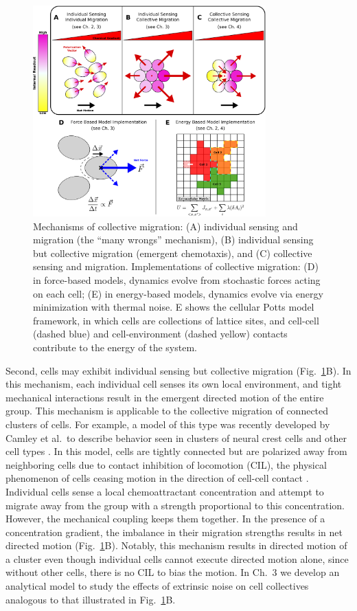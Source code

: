 \begin{figure}[ht]
    \centering
        \includegraphics[width=0.8\textwidth]{../fig/ch1_fig3.pdf}
    \caption{Mechanisms of collective migration: (A) individual sensing and migration (the ``many wrongs'' mechanism), (B) individual sensing but collective migration (emergent chemotaxis), and (C) collective sensing and migration. Implementations of collective migration: (D) in force-based models, dynamics evolve from stochastic forces acting on each cell; (E) in energy-based models, dynamics evolve via energy minimization with thermal noise. E shows the cellular Potts model framework, in which cells are collections of lattice sites, and cell-cell (dashed blue) and cell-environment (dashed yellow) contacts contribute to the energy of the system.}
\label{fig:ch1_3}
\end{figure}


Second, cells may exhibit individual sensing but collective migration (Fig.\ \ref{fig:ch1_3}B). In this mechanism, each individual cell senses its own local environment, and tight mechanical interactions result in the emergent directed motion of the entire group. This mechanism is applicable to the collective migration of connected clusters of cells. For example, a model of this type was recently developed by Camley et al.\ to describe behavior seen in clusters of neural crest cells and other cell types \cite{camley2016emergent}. In this model, cells are tightly connected but are polarized away from neighboring cells due to contact inhibition of locomotion (CIL), the physical phenomenon of cells ceasing motion in the direction of cell-cell contact \cite{mayor2010keeping}. Individual cells sense a local chemoattractant concentration and attempt to migrate away from the group with a strength proportional to this concentration.
However, the mechanical coupling keeps them together. In the presence of a concentration gradient, the imbalance in their migration strengths results in net directed motion (Fig.\ \ref{fig:ch1_3}B). Notably, this mechanism results in directed motion of a cluster even though individual cells cannot execute directed motion alone, since without other cells, there is no CIL to bias the motion. In Ch.\ 3 we develop an analytical model to study the effects of extrinsic noise on cell collectives analogous to that illustrated in Fig.\ \ref{fig:ch1_3}B.

